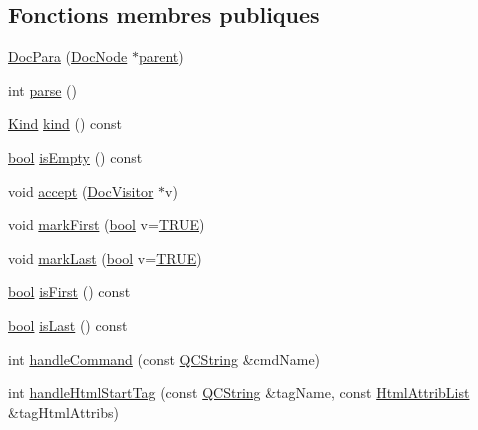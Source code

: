 \subsection*{Fonctions membres publiques}
\begin{DoxyCompactItemize}
\item 
\hyperlink{class_doc_para_a38a380c29bbd63a5a4170ad20a8bade3}{Doc\+Para} (\hyperlink{class_doc_node}{Doc\+Node} $\ast$\hyperlink{class_doc_node_a990d8b983962776a647e6231d38bd329}{parent})
\item 
int \hyperlink{class_doc_para_afbe48d84c35630599a17f907df4f9804}{parse} ()
\item 
\hyperlink{class_doc_node_aebd16e89ca590d84cbd40543ea5faadb}{Kind} \hyperlink{class_doc_para_ac802ce4f07b2fcde259e6cd520dc040c}{kind} () const 
\item 
\hyperlink{qglobal_8h_a1062901a7428fdd9c7f180f5e01ea056}{bool} \hyperlink{class_doc_para_a6dae7d8c42447e8bfdccdd5c68e324a9}{is\+Empty} () const 
\item 
void \hyperlink{class_doc_para_a5c8cd8dc94b86fc379fe68fb4cfb50dd}{accept} (\hyperlink{class_doc_visitor}{Doc\+Visitor} $\ast$v)
\item 
void \hyperlink{class_doc_para_a849868e81af1e2ae0da511fa3e5a91b8}{mark\+First} (\hyperlink{qglobal_8h_a1062901a7428fdd9c7f180f5e01ea056}{bool} v=\hyperlink{qglobal_8h_a04a6422a52070f0dc478693da640242b}{T\+R\+U\+E})
\item 
void \hyperlink{class_doc_para_a569bc5841973bac45491c977814f62e0}{mark\+Last} (\hyperlink{qglobal_8h_a1062901a7428fdd9c7f180f5e01ea056}{bool} v=\hyperlink{qglobal_8h_a04a6422a52070f0dc478693da640242b}{T\+R\+U\+E})
\item 
\hyperlink{qglobal_8h_a1062901a7428fdd9c7f180f5e01ea056}{bool} \hyperlink{class_doc_para_a06ae2da49920a6230111a95356e40908}{is\+First} () const 
\item 
\hyperlink{qglobal_8h_a1062901a7428fdd9c7f180f5e01ea056}{bool} \hyperlink{class_doc_para_a06fe9ac9a85380a67106ba46eef7d192}{is\+Last} () const 
\item 
int \hyperlink{class_doc_para_aae430172da0e9fa3803184d48c6d3394}{handle\+Command} (const \hyperlink{class_q_c_string}{Q\+C\+String} \&cmd\+Name)
\item 
int \hyperlink{class_doc_para_a64806f3cd0fecd593b8ad7f6ef331688}{handle\+Html\+Start\+Tag} (const \hyperlink{class_q_c_string}{Q\+C\+String} \&tag\+Name, const \hyperlink{class_html_attrib_list}{Html\+Attrib\+List} \&tag\+Html\+Attribs)
\item 

\end{DoxyCompactItemize}
